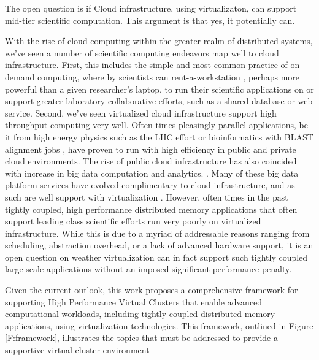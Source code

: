 The open question is if Cloud infrastructure, using virtualizaton, can support mid-tier scientific computation.  This argument is that yes, it potentially can.

With the rise of cloud computing within the greater realm of distributed systems, we've seen a number of scientific computing endeavors map well to cloud infrastructure. First, this includes the simple and most common practice of on demand computing, where by scientists can rent-a-workstation \cite{something-boring}, perhaps more powerful than a given researcher's laptop, to run their scientific applications on or support greater laboratory collaborative efforts, such as a shared database or web service. Second, we've seen virtualized cloud infrastructure support high throughput computing very well. Often times pleasingly parallel applications, be it from high energy physics such as the LHC effort \cite{lhc, cern-openstack} or bioinformatics with BLAST alignment jobs \cite{cloud-blast}, have proven to run with high efficiency in public and private cloud environments. The rise of public cloud infrastructure has also coincided with increase in big data computation and analytics. .  Many of these big data platform services have evolved complimentary to cloud infrastructure, and as such are well support with virtualization \cite{hadoop-ec2}.  However, often times in the past tightly coupled, high performance distributed memory applications that often support leading class scientific efforts run very poorly on virtualized infrastructure.  While this is due to a myriad of addressable reasons ranging from scheduling, abstraction overhead, or a lack of advanced hardware support, it is an open question on weather virtualization can in fact support such tightly coupled large scale applications without an imposed significant performance penalty.  



Given the current outlook, this work proposes a comprehensive framework for supporting High Performance Virtual Clusters that enable advanced computational workloads, including tightly coupled distributed memory applications, using virtualization technologies. This framework, outlined in Figure \ref{F:framework}, illustrates the topics that must be addressed to provide a supportive virtual cluster environment 

